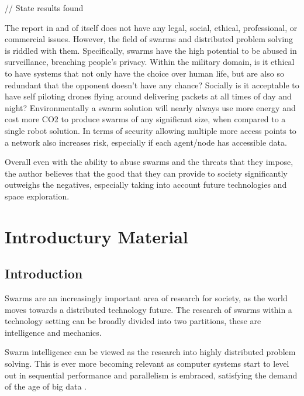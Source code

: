 \documentclass{UoYCSproject}
\begin{document}
\begin{summary}
// State results found

The report in and of itself does not have any legal, social, ethical, professional, or commercial issues. However, the field of swarms and distributed problem solving is riddled with them. Specifically, swarms have the high potential to be abused in surveillance, breaching people's privacy. Within the military domain, is it ethical to have systems that not only have the choice over human life, but are also so redundant that the opponent doesn’t have any chance? Socially is it acceptable to have self piloting drones flying around delivering packets at all times of day and night? Environmentally a swarm solution will nearly always use more energy and cost more CO2 to produce swarms of any significant size, when compared to a single robot solution. In terms of security allowing multiple more access points to a network also increases risk, especially if each agent/node has accessible data.

Overall even with the ability to abuse swarms and the threats that they impose, the author believes that the good that they can provide to society significantly outweighs the negatives, especially taking into account future technologies and space exploration.

\end{summary}


\chapter{Introductury Material}
\label{cha:Introductury Material}

\section{Introduction}
\label{sec:Introduction}

Swarms are an increasingly important area of research for society, as the world moves towards a distributed technology future.
The research of swarms within a technology setting can be broadly divided into two partitions, these are intelligence and mechanics.

Swarm intelligence can be viewed as the research into highly distributed problem solving\cite{Cognitive maps mine detection, Swarm intellegiegence}.
This is ever more becoming relevant as computer systems start to level out in sequential performance \cite{CPU speed} and parallelism is embraced, satisfying the demand of the age of big data \cite{Avalability storage}.
\end{document}
